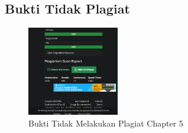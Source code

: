 \subsection{Bukti Tidak Plagiat}
\begin{figure}[H]
\centering
	\includegraphics[width=4cm]{figures/1174021/tugas4/buktiplagiat/1.PNG}
	\caption{Bukti Tidak Melakukan Plagiat Chapter 5}
\end{figure}

